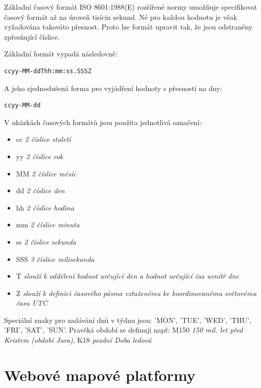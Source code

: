 Základní časový formát ISO 8601:1988(E) rozšířené normy umožňuje
specifikovat časový formát až na úroveň tisícin sekund. Né pro každou
hodnotu je však vyžadována takováto přesnost. Proto lze formát upravit
tak, že jsou odstraněny zpřesňující číslice.

\noindent
Základní formát vypadá následovně:

\begin{verbatim}
ccyy-MM-ddThh:mm:ss.SSSZ
\end{verbatim}

\noindent
A jeho zjednodušená forma pro vyjádření hodnoty s přesností na dny:

\begin{verbatim}
ccyy-MM-dd
\end{verbatim}

\newpage
\noindent
V ukázkách časových formátů jsou použita jednotlivá označení:

\begin{itemize}
	\item cc \textit{2 číslice století}
	\item yy \textit{2 číslice rok}
	\item MM \textit{2 číslice měsíc}
	\item dd \textit{2 číslice den}
	\item hh \textit{2 číslice hodina}
	\item mm \textit{2 číslice minuta}
	\item ss \textit{2 číslice sekunda}
	\item SSS \textit{3 číslice milisekunda}
\end{itemize}

\begin{itemize}
	\item T \textit{slouží k oddělení hodnot určující den a hodnot určující čas uvnitř dne}
	\item Z \textit{slouží k definici časového pásma vztaženému ke koordinovanému světovému času UTC}
\end{itemize}

Speciální znaky pro zadávání dnů v týdnu jsou: 'MON', 'TUE', 'WED',
'THU', 'FRI', 'SAT', 'SUN'. Pravěká období se definují např: M150
\textit{150 mil. let před Kristem (období Jura)}, K18 \textit{pozdní
  Doba ledová}

\newpage
\section{Webové mapové platformy}

